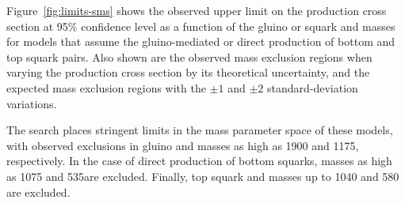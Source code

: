 %

Figure~\ref{fig:limits-sms} shows the observed upper limit on the
production cross section at 95\% confidence level as a function of the
gluino or squark and \chiz masses for models that assume the
gluino-mediated or direct production of bottom and top squark
pairs. Also shown are the observed mass exclusion regions when varying
the production cross section by its theoretical uncertainty, and the
expected mass exclusion regions with the ${\pm}1$ and ${\pm}2$
standard-deviation variations.

The search places stringent limits in the mass parameter space of
these models, with observed exclusions in gluino and \chiz masses as
high as 1900 and 1175\GeV, respectively. In the case of direct
production of bottom squarks, masses as high as 1075 and 535\GeV are
excluded. Finally, top squark and \chiz masses up to 1040 and 580\GeV
are excluded. 

